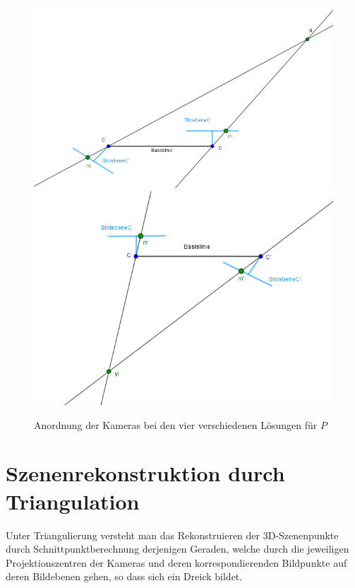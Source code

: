 \begin{figure}[!htb]
	\includegraphics[width=\linewidth]{images/P_Solution_three.png}
	\label{fig:awesome_image1}
	\endminipage\hfill
	\includegraphics[width=\linewidth]{images/P_Solution_four.png}
	\label{fig:awesome_image2}
	\endminipage\hfill
	\caption{Anordnung der Kameras bei den vier verschiedenen Lösungen für $P$}
\end{figure}
\pagebreak

\section{Szenenrekonstruktion durch Triangulation}


Unter Triangulierung versteht man das Rekonstruieren der 3D-Szenenpunkte durch Schnittpunktberechnung derjenigen Geraden, welche durch die jeweiligen Projektionszentren der Kameras und deren korrespondierenden Bildpunkte auf deren Bildebenen gehen, so dass sich ein Dreick bildet.\\


